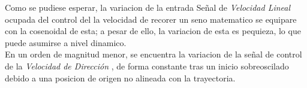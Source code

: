 \documentclass[a4paper,twoside]{article}
\begin{document}
\begin{itemize}
	Como se pudiese esperar, la variacion de la entrada Señal de \textit{Velocidad Lineal} ocupada del control
	del la velocidad de recorer un seno matematico se equipare con la cosenoidal de esta; a pesar de ello,
	la variacion de esta es pequieza, lo que puede asumirse a nivel dinamico.\\
	En un orden de magnitud menor, se encuentra la variacion de la señal de control de la \textit{Velocidad de Dirección}
	, de forma constante tras un inicio sobreoscilado debido a una posicion de origen no alineada con la trayectoria.\\



	\end{itemize}





%
%
\end{document}
